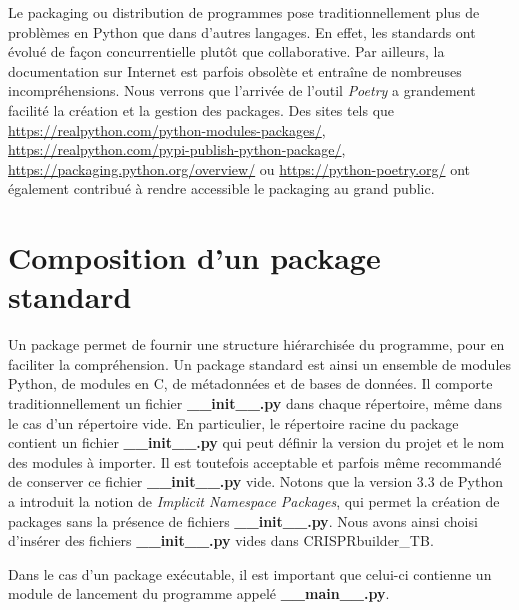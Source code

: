 \documentclass[twoside,a4paper,11pt,frenchb,openany]{report}
\begin{document}
Le packaging ou distribution de programmes pose traditionnellement plus de problèmes en Python que dans d'autres langages. En effet, les standards ont évolué de façon concurrentielle plutôt que collaborative. Par ailleurs, la documentation sur Internet est parfois obsolète et entraîne de nombreuses incompréhensions. Nous verrons que l'arrivée de l'outil \textit{Poetry} a grandement facilité la création et la gestion des packages. Des sites tels que \url{https://realpython.com/python-modules-packages/}, \url{https://realpython.com/pypi-publish-python-package/}, \url{https://packaging.python.org/overview/} ou \url{https://python-poetry.org/} ont également contribué à rendre accessible le packaging au grand public.





\section{Composition d'un package standard}

Un package permet de fournir une structure hiérarchisée du programme, pour en faciliter la compréhension. Un package standard est ainsi un ensemble de modules Python, de modules en C, de métadonnées et de bases de données. Il comporte traditionnellement un fichier \textbf{\_\_init\_\_.py} dans chaque répertoire, même dans le cas d'un répertoire vide. En particulier, le répertoire racine du package contient un fichier \textbf{\_\_init\_\_.py} qui peut définir la version du projet et le nom des modules à importer. Il est toutefois acceptable et parfois même recommandé de conserver ce fichier \textbf{\_\_init\_\_.py} vide. Notons que la version 3.3 de Python a introduit la notion de \textit{Implicit Namespace Packages}, qui permet la création de packages sans la présence de fichiers  \textbf{\_\_init\_\_.py}. Nous avons ainsi choisi d'insérer des fichiers \textbf{\_\_init\_\_.py} vides dans CRISPRbuilder\_TB.

Dans le cas d'un package exécutable, il est important que celui-ci contienne un module de lancement du programme appelé  \textbf{\_\_main\_\_.py}.
\end{document}

